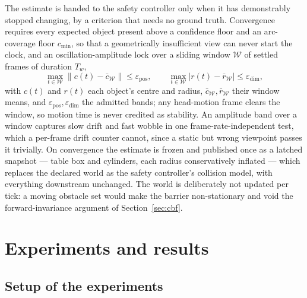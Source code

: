 \documentclass[12pt,a4paper,twoside,openright]{report}
\begin{document}
The estimate is handed to the safety controller only when it has demonstrably stopped changing, by a criterion that needs no ground truth. Convergence requires every expected object present above a confidence floor and an arc-coverage floor $c_{\min}$, so that a geometrically insufficient view can never start the clock, and an oscillation-amplitude lock over a sliding window $\mathcal{W}$ of settled frames of duration $T_w$,
\begin{equation}
\max_{t \in \mathcal{W}} \bigl\|c(t) - \bar{c}_{\mathcal{W}}\bigr\| \le \varepsilon_{\text{pos}},
\qquad
\max_{t \in \mathcal{W}} \bigl|r(t) - \bar{r}_{\mathcal{W}}\bigr| \le \varepsilon_{\text{dim}},
\label{eq:amplock}
\end{equation}
with $c(t)$ and $r(t)$ each object's centre and radius, $\bar{c}_{\mathcal{W}}, \bar{r}_{\mathcal{W}}$ their window means, and $\varepsilon_{\text{pos}}, \varepsilon_{\text{dim}}$ the admitted bands; any head-motion frame clears the window, so motion time is never credited as stability. An amplitude band over a window captures slow drift and fast wobble in one frame-rate-independent test, which a per-frame drift counter cannot, since a static but wrong viewpoint passes it trivially. On convergence the estimate is frozen and published once as a latched snapshot --- table box and cylinders, each radius conservatively inflated --- which replaces the declared world as the safety controller's collision model, with everything downstream unchanged. The world is deliberately not updated per tick: a moving obstacle set would make the barrier non-stationary and void the forward-invariance argument of Section~\ref{sec:cbf}.

\chapter{Experiments and results}
\label{ch:exp}

\section{Setup of the experiments}
\label{sec:study}
\end{document}
